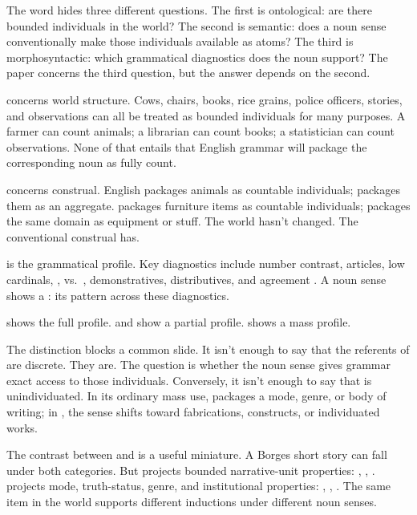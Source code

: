 \documentclass[12pt,a4paper]{article}
\begin{document}
The word  hides three different questions. The first is ontological: are there bounded individuals in the world? The second is semantic: does a noun sense conventionally make those individuals available as atoms? The third is morphosyntactic: which grammatical diagnostics does the noun support? The paper concerns the third question, but the answer depends on the second.

 concerns world structure. Cows, chairs, books, rice grains, police officers, stories, and observations can all be treated as bounded individuals for many purposes. A farmer can count animals; a librarian can count books; a statistician can count observations. None of that entails that English grammar will package the corresponding noun as fully count.

 concerns construal. English  packages animals as countable individuals;  packages them as an aggregate.  packages furniture items as countable individuals;  packages the same domain as equipment or stuff. The world hasn't changed. The conventional construal has.

 is the grammatical profile. Key diagnostics include number contrast, articles, low cardinals, ,  vs.\ , demonstratives, distributives, and agreement \citep[pp.~333--336]{huddleston2002,allan1980}. A noun sense shows a : its pattern across these diagnostics.

 shows the full profile.  and  show a partial profile.  shows a mass profile.

The distinction blocks a common slide. It isn't enough to say that the referents of  are discrete. They are. The question is whether the noun sense gives grammar exact access to those individuals. Conversely, it isn't enough to say that  is unindividuated. In its ordinary mass use,  packages a mode, genre, or body of writing; in , the sense shifts toward fabrications, constructs, or individuated works.

The contrast between  and  is a useful miniature. A Borges short story can fall under both categories. But  projects bounded narrative-unit properties: , , .  projects mode, truth-status, genre, and institutional properties: , , . The same item in the world supports different inductions under different noun senses.
\end{document}
